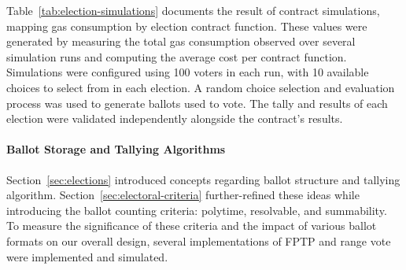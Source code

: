 
Table~\ref{tab:election-simulations} documents the result of contract
simulations, mapping gas consumption by election contract function. These values
were generated by measuring the total gas consumption observed over several
simulation runs and computing the average cost per contract function.
Simulations were configured using 100 voters in each run, with 10 available
choices to select from in each election. A random choice selection and
evaluation process was used to generate ballots used to  vote. The tally and
results of each election were validated independently alongside the contract's
results.

\paragraph{Ballot Storage and Tallying Algorithms}

Section~\ref{sec:elections} introduced concepts regarding ballot structure and
tallying algorithm. Section~\ref{sec:electoral-criteria} further-refined
these ideas while introducing the ballot counting criteria: polytime,
resolvable, and summability. To measure the significance of these criteria and
the impact of various ballot formats on our overall design, several
implementations of FPTP and range vote were implemented and simulated.

